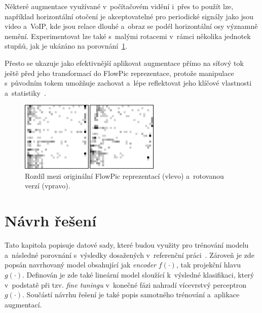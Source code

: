 Některé augmentace využívané v~počítačovém vidění i~přes to použít lze, například horizontální otočení je akceptovatelné pro periodické signály jako jsou video a~VoIP, kde jsou relace dlouhé a~obraz se podél horizontální osy významně nemění. Experimentovat lze také s~malými rotacemi v~rámci několika jednotek stupňů, jak je ukázáno na porovnání~\ref{flowpic_rotation}.

Přesto se ukazuje jako efektivnější aplikovat augmentace přímo na síťový tok ještě před jeho transformací do FlowPic reprezentace, protože manipulace s~původním tokem umožňuje zachovat a~lépe reflektovat jeho klíčové vlastnosti a~statistiky~\cite{flowpic_augmentations}.
\begin{figure}[H]
	\centering
	\includegraphics[width=0.6\textwidth]{obrazky-figures/rotation_and_orig.png}
	\caption{Rozdíl mezi originální FlowPic reprezentací (vlevo) a~rotovanou verzí (vpravo).}
	\label{flowpic_rotation}
\end{figure}

\chapter{Návrh řešení}
Tato kapitola popisuje datové sady, které budou využity pro trénování modelu a~následné porovnání s~výsledky dosažených v~referenční práci~\cite{flowpic_augmentations}. Zároveň je zde popsán navrhovaný model obsahující jak \textit{encoder} $f(\cdot)$, tak projekční hlavu $g(\cdot)$. Definován je zde také lineární model sloužící k~výsledné klasifikaci, který v~podstatě při tzv. \textit{fine tuningu} v~konečné fázi nahradí vícevrstvý perceptron $g(\cdot)$. Součástí návrhu řešení je také popis samotného trénování a~aplikace augmentací.


